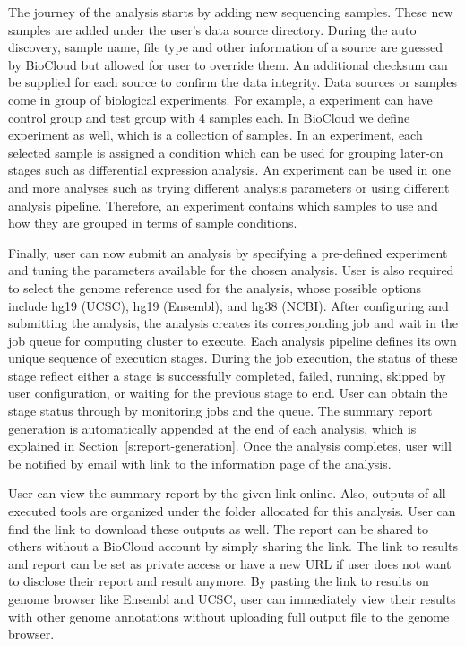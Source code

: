 

The journey of the analysis starts by adding new sequencing samples. These new
samples are added under the user's data source directory. During the auto
discovery, sample name, file type and other information of a source are guessed
by BioCloud but allowed for user to override them. An additional checksum can
be supplied for each source to confirm the data integrity. Data sources or
samples come in group of biological experiments. For example, a experiment can
have control group and test group with 4 samples each. In BioCloud we define
experiment as well, which is a collection of samples. In an experiment, each
selected sample is assigned a condition which can be used for grouping later-on
stages such as differential expression analysis. An experiment can be used in
one and more analyses such as trying different analysis parameters or using
different analysis pipeline. Therefore, an experiment contains which samples to
use and how they are grouped in terms of sample conditions.

Finally, user can now submit an analysis by specifying a pre-defined experiment
and tuning the parameters available for the chosen analysis. User is also
required to select the genome reference used for the analysis, whose possible
options include hg19 (UCSC), hg19 (Ensembl), and hg38 (NCBI). After configuring
and submitting the analysis, the analysis creates its corresponding job and
wait in the job queue for computing cluster to execute. Each analysis pipeline
defines its own unique sequence of execution stages. During the job execution,
the status of these stage reflect either a stage is successfully completed,
failed, running, skipped by user configuration, or waiting for the previous
stage to end. User can obtain the stage status through by monitoring jobs and
the queue. The summary report generation is automatically appended at the end
of each analysis, which is explained in Section~\ref{s:report-generation}. Once
the analysis completes, user will be notified by email with link to the
information page of the analysis.

User can view the summary report by the given link online. Also, outputs of all
executed tools are organized under the folder allocated for this analysis. User
can find the link to download these outputs as well. The report can be shared
to others without a BioCloud account by simply sharing the link. The link to
results and report can be set as private access or have a new URL if user does
not want to disclose their report and result anymore. By pasting the link to
results on genome browser like Ensembl and UCSC, user can immediately view
their results with other genome annotations without uploading full output file
to the genome browser.

